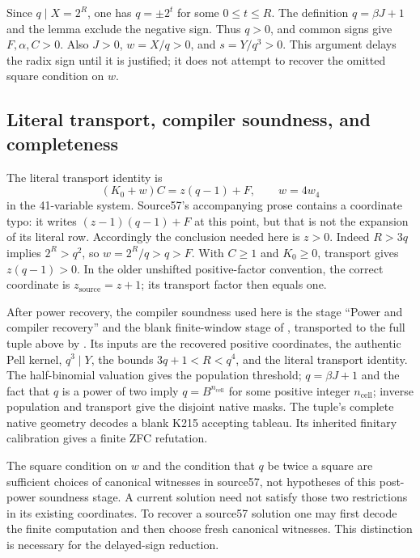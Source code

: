Since \(q\mid X=2^R\), one has \(q=\pm2^t\) for some
\(0\leq t\leq R\).  The definition \(q=\beta J+1\) and the lemma
exclude the negative sign.  Thus \(q>0\), and common signs give
\(F,\alpha,C>0\).  Also \(J>0\), \(w=X/q>0\), and
\(s=Y/q^3>0\).  This argument delays the radix sign until it is justified;
it does not attempt to recover the omitted square condition on \(w\).

\subsection{Literal transport, compiler soundness, and completeness}

The literal transport identity is
\[
 (K_0+w)C=z(q-1)+F,\qquad w=4w_4
\]
in the 41-variable system.  Source57's accompanying prose contains a
coordinate typo: it writes \((z-1)(q-1)+F\) at this point, but that is
not the expansion of its literal row.  Accordingly the conclusion needed
here is \(z>0\).  Indeed \(R>3q\) implies \(2^R>q^2\), so
\(w=2^R/q>q>F\).  With \(C\geq1\) and \(K_0\geq0\), transport
gives \(z(q-1)>0\).  In the older unshifted positive-factor convention,
the correct coordinate is \(z_{\mathrm{source}}=z+1\); its transport
factor then equals one.

After power recovery, the compiler soundness used here is the stage
``Power and compiler recovery'' and the blank finite-window stage of
, transported to the full tuple
above by .  Its inputs are the
recovered positive coordinates, the authentic Pell kernel,
\(q^3\mid Y\), the bounds \(3q+1<R<q^4\), and the literal transport
identity.  The half-binomial valuation gives the population threshold;
\(q=\beta J+1\) and the fact that \(q\) is a power of two imply
\(q=B^{n_{\mathrm{cell}}}\) for some positive integer
\(n_{\mathrm{cell}}\); inverse population and
transport give the disjoint native masks.  The tuple's complete native
geometry decodes a blank K215 accepting tableau.  Its inherited finitary
calibration gives a finite ZFC refutation.

The square condition on \(w\) and the condition that \(q\) be twice a
square are sufficient choices of canonical witnesses in source57, not
hypotheses of this post-power soundness stage.  A current solution need
not satisfy those two restrictions in its existing coordinates.  To
recover a source57 solution one may first decode the finite computation
and then choose fresh canonical witnesses.  This distinction is necessary
for the delayed-sign reduction.

